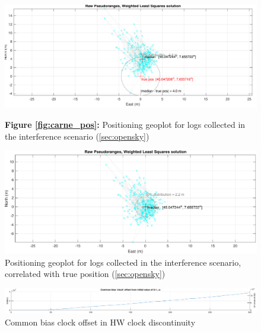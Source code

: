 \begin{figure}[H]
    \centering
    \begin{minipage}[b]{0.48\linewidth}
        \centering
        \includegraphics[width=1.00\linewidth]{images/carne_pos.pdf}
        \captionsetup{labelformat=empty}
        \caption{\textbf{Figure \ref{fig:carne_pos}:} Positioning geoplot for logs collected in the interference scenario (\ref{sec:opensky})}
        \end{minipage}
    \hfill
    \begin{minipage}[b]{0.48\linewidth}
        \centering
        \includegraphics[width=1.00\linewidth]{images/carne_pos_precision.pdf}
        \caption{Positioning geoplot for logs collected in the interference scenario, correlated with true position (\ref{sec:opensky})}
        \label{fig:carne_pos_precision}

    \end{minipage}
\end{figure}


\begin{figure}[H]
    \centering
    \includegraphics[width=0.95\linewidth]{images/discontinuity_bias_clock.pdf}
    \caption{Common bias clock offset in HW clock discontinuity} 
    \label{fig:discontinuity_bias_clock}
\end{figure}

